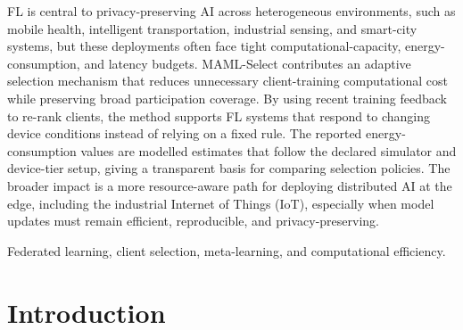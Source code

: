 \documentclass[journal]{IEEEtran}
\newcommand{\revision}[1]{#1}
\begin{document}
\begin{abstract}
{After the selected clients return their updates, the same policy is meta-updated using the new feedback. We evaluate MAML-Select on Fashion-MNIST, CIFAR-10, and CIFAR-100 with 100 clients, K = 10 selected clients per round, a Dirichlet non-IID split with $\alpha=0.5$, and three random seeds. On Fashion-MNIST, CIFAR-10, and CIFAR-100, MAML-Select provides competitive accuracy with significantly lower cumulative Tera Floating-Point Operations (TFLOPs) and modelled energy consumption. Higher values of Jain-index values also demonstrates the fairness of the proposed method. %
}
\end{abstract}
\renewcommand\IEEEkeywordsname{Impact Statement}
\begin{IEEEkeywords}
\revision{FL is central to privacy-preserving AI across heterogeneous environments, such as mobile health, intelligent transportation, industrial sensing, and smart-city systems, but these deployments often face tight computational-capacity, energy-consumption, and latency budgets. MAML-Select contributes an adaptive selection mechanism that reduces unnecessary client-training computational cost while preserving broad participation coverage. By using recent training feedback to re-rank clients, the method supports FL systems that respond to changing device conditions instead of relying on a fixed rule. The reported energy-consumption values are modelled estimates that follow the declared simulator and device-tier setup, giving a transparent basis for comparing selection policies. The broader impact is a more resource-aware path for deploying distributed AI at the edge, including the industrial Internet of Things (IoT), especially when model updates must remain efficient, reproducible, and privacy-preserving.}


\end{IEEEkeywords}
\renewcommand\IEEEkeywordsname{Index Terms}
\begin{IEEEkeywords}
Federated learning, client selection, meta-learning, and computational efficiency.
\end{IEEEkeywords}
\section{Introduction}
\end{document}
